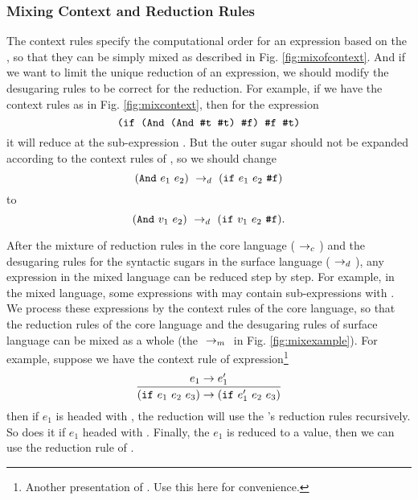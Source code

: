 \subsubsection{Mixing Context and Reduction Rules}

The context rules specify the computational order for an expression based on the , so that they can be simply mixed as described in Fig. \ref{fig:mixofcontext}. And if we want to limit the unique reduction of an expression, we should modify the desugaring rules to be correct for the reduction. For example, if we have the context rules as in Fig. \ref{fig:mixcontext}, then for the expression
\[
	\texttt{(if (And (And \#t~\#t) \#f) \#f~\#t)}
\]
it will reduce at the sub-expression . But the outer  sugar should not be expanded according to the context rules of , so we should change
\[
	(\mbox{\tt And}~e_1~e_2) ~\rightarrow_d~ (\mbox{\tt if}~e_1~e_2~\mbox{\tt \#f})
\]
to
\[
	(\mbox{\tt And}~v_1~e_2) ~\rightarrow_d~ (\mbox{\tt if}~v_1~e_2~\mbox{\tt \#f}).
\]

After the mixture of reduction rules in the core language ($~\rightarrow_c~$) and the  desugaring rules for the syntactic sugars in the surface language ($~\rightarrow_d~$), any expression in the mixed language can be reduced step by step. For example, in the mixed language, some expressions with  may contain sub-expressions with . We process these expressions by the context rules of the core language, so that the reduction rules of the core language and the desugaring rules of surface language can be mixed as a whole
 (the $~\rightarrow_m~$ in Fig. \ref{fig:mixexample}). For example, suppose we have the context rule of  expression\footnote{Another presentation of . Use this here for convenience.}
\[
\infer{(\m{if}~e_1~e_2~e_3) \rightarrow (\m{if}~e_1'~e_2~e_3)}{e_1 \rightarrow e_1'}
\]
then if $e_1$ is headed with , the reduction will use the 's reduction rules recursively. So does it if $e_1$ headed with . Finally, the $e_1$ is reduced to a value, then we can use the reduction rule of .
